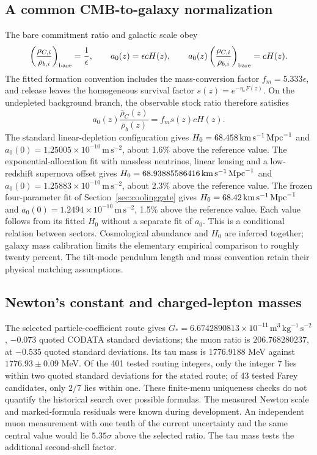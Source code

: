 \subsection{A common CMB-to-galaxy normalization}
\label{sec:crossnorm}
The bare commitment ratio and galactic scale obey
\begin{equation}
\left(\frac{\rho_{C,i}}{\rho_{b,i}}\right)_{\rm bare}=\frac1\epsilon,\qquad
a_0(z)=\epsilon cH(z),\qquad
a_0(z)\left(\frac{\rho_{C,i}}{\rho_{b,i}}\right)_{\rm bare}=cH(z).
\end{equation}
The fitted formation convention includes the mass-conversion factor
$f_m=5.333\epsilon$, and release leaves the homogeneous survival factor
$s(z)=e^{-\eta_*F(z)}$. On the undepleted background branch, the
observable stock ratio therefore satisfies
\begin{equation}
a_0(z)\frac{\bar\rho_C(z)}{\bar\rho_b(z)}=f_m s(z)cH(z).
\label{eq:crossnorm}
\end{equation}
The standard linear-depletion configuration gives
$H_0=68.458\,\mathrm{km\,s^{-1}}\,\mathrm{Mpc}^{-1}$ and
$a_0(0)=1.25005\times10^{-10}\,\mathrm{m\,s^{-2}}$,
about 1.6\% above the reference value. The exponential-allocation fit with
massless neutrinos, linear lensing and a low-redshift supernova offset gives
$H_0=68.93885586416\,\mathrm{km\,s^{-1}}\,\mathrm{Mpc}^{-1}$ and
$a_0(0)=1.25883\times10^{-10}\,\mathrm{m\,s^{-2}}$,
about 2.3\% above the reference value. The frozen four-parameter fit of
Section~\ref{sec:coolinggate} gives $H_0=68.42\,\mathrm{km\,s^{-1}}\,\mathrm{Mpc}^{-1}$
and $a_0(0)=1.2494\times10^{-10}\,\mathrm{m\,s^{-2}}$, 1.5\% above the
reference value. Each value follows from its fitted
$H_0$ without a separate fit of $a_0$.
This is a conditional relation between sectors. Cosmological abundance
and $H_0$ are inferred together; galaxy mass calibration limits the
elementary empirical comparison to roughly twenty percent. The tilt-mode pendulum length and mass convention retain their physical matching assumptions.

\subsection{Newton's constant and charged-lepton masses}
\label{sec:constants}
The selected particle-coefficient route gives
$G_*=6.6742890813\times10^{-11}\,\mathrm{m^3\,kg^{-1}\,s^{-2}}$,
$-0.073$ quoted CODATA standard deviations; the muon ratio is
$206.768280237$, at $-0.535$ quoted standard deviations. Its tau mass
is 1776.9188 MeV against $1776.93\pm0.09$ MeV. Of the 401 tested
routing integers, only the integer $7$ lies within two quoted standard deviations
for the stated route; of 43 tested Farey candidates, only $2/7$ lies
within one. These finite-menu uniqueness checks do not quantify the
historical search over possible formulas. The measured Newton scale
and marked-formula residuals were known during development. An independent
muon measurement with one tenth of the current uncertainty and the same
central value would lie $5.35\sigma$ above the selected ratio. The tau
mass tests the additional second-shell factor. 
\cite{constantsnew}

